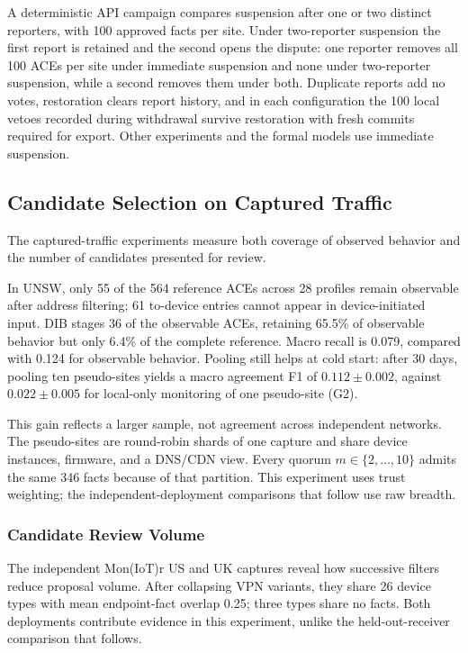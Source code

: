 \documentclass[journal]{IEEEtran}
\theoremstyle{definition}
\begin{document}
A deterministic API campaign compares suspension after one or two distinct reporters, with 100 approved facts per site. Under two-reporter suspension the first report is retained and the second opens the dispute: one reporter removes all 100 ACEs per site under immediate suspension and none under two-reporter suspension, while a second removes them under both. Duplicate reports add no votes, restoration clears report history, and in each configuration the 100 local vetoes recorded during withdrawal survive restoration with fresh commits required for export. Other experiments and the formal models use immediate suspension.

\subsection{Candidate Selection on Captured Traffic}
\label{sec:utility-results}
The captured-traffic experiments measure both coverage of observed behavior and the number of candidates presented for review.



In UNSW, only 55 of the 564 reference ACEs across 28 profiles remain observable after address filtering; 61 to-device entries cannot appear in device-initiated input. DIB stages 36 of the observable ACEs, retaining 65.5\% of observable behavior but only 6.4\% of the complete reference. Macro recall is 0.079, compared with 0.124 for observable behavior. Pooling still helps at cold start: after 30 days, pooling ten pseudo-sites yields a macro agreement F1 of $0.112\pm0.002$, against $0.022\pm0.005$ for local-only monitoring of one pseudo-site (G2).

This gain reflects a larger sample, not agreement across independent networks. The pseudo-sites are round-robin shards of one capture and share device instances, firmware, and a DNS/CDN view. Every quorum $m\in\{2,\ldots,10\}$ admits the same 346 facts because of that partition. This experiment uses trust weighting; the independent-deployment comparisons that follow use raw breadth.

\subsubsection{Candidate Review Volume}
\label{sec:workload-results}
The independent Mon(IoT)r US and UK captures reveal how successive filters reduce proposal volume. After collapsing VPN variants, they share 26 device types with mean endpoint-fact overlap 0.25; three types share no facts. Both deployments contribute evidence in this experiment, unlike the held-out-receiver comparison that follows.
\end{document}
